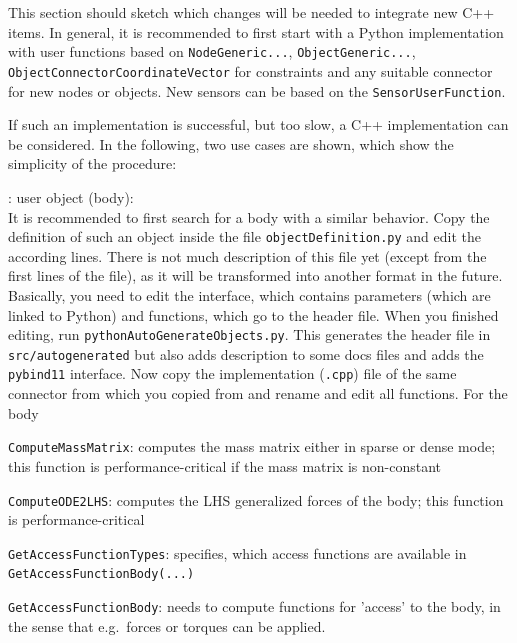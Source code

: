 
%
This section should sketch which changes will be needed to integrate new C++ items.
In general, it is recommended to first start with a Python implementation with user functions based on
\texttt{NodeGeneric...}, \texttt{ObjectGeneric...}, \texttt{ObjectConnectorCoordinateVector} for constraints and
any suitable connector for new nodes or objects. New sensors can be based on the \texttt{SensorUserFunction}.

If such an implementation is successful, but too slow, a C++ implementation can be considered.
In the following, two use cases are shown, which show the simplicity of the procedure:
\bi
  \item {}: user object (body):\\
  It is recommended to first search for a body with a similar behavior.
  Copy the definition of such an object inside the file \texttt{objectDefinition.py} and edit the according lines. 
  There is not much description of 
  this file yet (except from the first lines of the file), as it will be transformed into another format in the future.
  Basically, you need to edit the interface, which contains parameters (which are linked to Python) and functions, 
  which go to the header file.
  When you finished editing, run \texttt{pythonAutoGenerateObjects.py}. This generates the header file in \texttt{src/autogenerated}
  but also adds description to some docs files and adds the \texttt{pybind11} interface. 
  Now copy the implementation (\texttt{.cpp}) file of the same connector from which you copied from and rename and edit all functions.
  For the body
  \bi
    \item \texttt{ComputeMassMatrix}: computes the mass matrix either in sparse or dense mode; this function is performance-critical if the mass matrix is non-constant
    \item \texttt{ComputeODE2LHS}: computes the \ac{LHS} generalized forces of the body; this function is performance-critical
    \item \texttt{GetAccessFunctionTypes}: specifies, which access functions are available in \texttt{GetAccessFunctionBody(...)}
    \item \texttt{GetAccessFunctionBody}: needs to compute functions for 'access' to the body, in the sense that e.g.\ forces or torques can be applied. 
